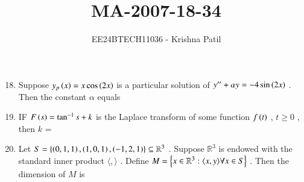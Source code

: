\documentclass[journal]{IEEEtran}
\begin{document}

\vspace{3cm}

\title{MA-2007-18-34}
\author{EE24BTECH11036 - Krishna Patil}
{\let\newpage\relax\maketitle}
\begin{enumerate}
\setcounter{enumi}{17}
\item Suppose $ y_p\left(x\right)=x\cos\left(2x\right) $ is a particular solution of $ y^{\prime\prime} + \alpha y = -4\sin\left(2x\right) $ . Then the constant $\alpha$ equals
\begin{enumerate}
\end{enumerate}
\item IF $ F\left(s\right) = \tan^{-1}{s} + k $ is the Laplace transform of some function $ f\left(t\right) $ , $ t \geq 0 $ , then $ k $ = 
\begin{enumerate}
\end{enumerate}
\item Let $ S = \left\{\left(0,1,1\right),\left(1,0,1\right),\left(-1,2,1\right)\right\} \subseteq \mathbb{R}^3 $ . Suppose $ \mathbb{R}^3 $ is endowed with the standard inner product $ \langle  , \rangle $ . Define $ M  = \left\{  x \in \mathbb{R}^3 : {\langle x,y \rangle} \forall x \in S \right\} $ . Then the dimension of $ M $ is 
\begin{enumerate}
\end{enumerate}
\end{enumerate}
\end{document}
